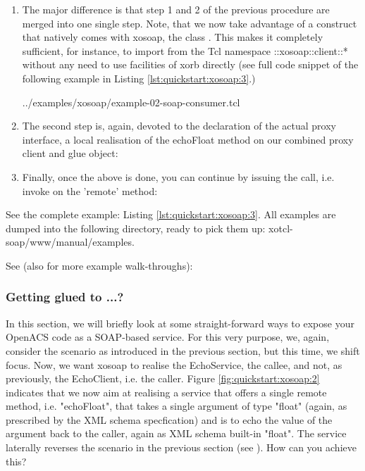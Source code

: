 \begin{enumerate}
\item The major difference is that step 1 and 2 of the previous procedure are merged into one single 
step. Note, that we now take advantage of a construct that natively comes with xosoap, the 
class . This makes it completely sufficient, for instance, to import from the Tcl 
namespace ::xosoap::client::* without any need to use facilities of xorb directly (see full code snippet of 
the following example in Listing \ref{lst:quickstart:xosoap:3}.)

{../examples/xosoap/example-02-soap-consumer.tcl}
\item The second step is, again, devoted to the declaration of the actual proxy interface, a local 
realisation of the echoFloat method on our combined proxy client and glue object:

\item Finally, once the above is done, you can continue by issuing the call, i.e. invoke on the 'remote' 
method:

\end{enumerate}

 \begin{hints}
\item See the complete example: Listing \ref{lst:quickstart:xosoap:3}. All examples are dumped into the following directory, ready to pick them up: xotcl-soap/www/manual/examples.
\item See (also for more example walk-throughs): 
\end{hints}

  
  \subsubsection{Getting glued to ...?}
  In this section, we will briefly look at some straight-forward ways to expose your OpenACS code as a 
SOAP-based service. For this very purpose, we, again, consider the scenario as introduced in the 
previous section, but this time, we shift focus. Now, we want xosoap to realise the EchoService, the 
callee, and not, as previously, the EchoClient, i.e. the caller. Figure \ref{fig:quickstart:xosoap:2} indicates 
that we now aim at realising a service that offers a single remote method, i.e. "echoFloat", that takes a 
single argument of type "float" (again, as prescribed by the XML schema specfication) and is to echo the 
value of the argument back to the caller, again as XML schema built-in "float". The service laterally 
reverses the scenario in the previous section (see ). How can you 
achieve this?

